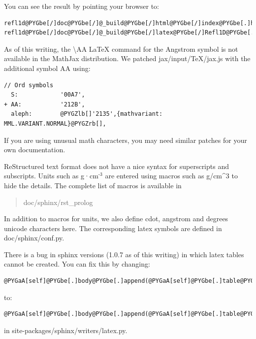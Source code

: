 \documentclass[letterpaper,10pt,english]{sphinxmanual}
\begin{document}
You can see the result by pointing your browser to:

\begin{Verbatim}[commandchars=@\[\]]
refl1d@PYGbe[/]doc@PYGbe[/]@_build@PYGbe[/]html@PYGbe[/]index@PYGbe[.]html
refl1d@PYGbe[/]doc@PYGbe[/]@_build@PYGbe[/]latex@PYGbe[/]Refl1D@PYGbe[.]pdf
\end{Verbatim}

As of this writing, the \textbackslash{}AA LaTeX command for the Angstrom symbol is not
available in the MathJax distribution. We patched jax/input/TeX/jax.js
with the additional symbol AA using:

\begin{Verbatim}[commandchars=@\[\]]
  // Ord symbols
  S:            '00A7',
+ AA:           '212B',
  aleph:        @PYGZlb[]'2135',{mathvariant: MML.VARIANT.NORMAL}@PYGZrb[],
\end{Verbatim}

If you are using unusual math characters, you may need similar patches
for your own documentation.

ReStructured text format does not have a nice syntax for superscripts and
subscripts.  Units such as g·cm$^{\text{-3}}$ are entered using macros such as
\textbar{}g/cm\textasciicircum{}3\textbar{} to hide the details.  The complete list of macros is available in
\begin{quote}

doc/sphinx/rst\_prolog
\end{quote}

In addition to macros for units, we also define cdot, angstrom and degrees
unicode characters here.  The corresponding latex symbols are defined in
doc/sphinx/conf.py.

There is a bug in sphinx versions (1.0.7 as of this writing) in which
latex tables cannot be created.  You can fix this by changing:

\begin{Verbatim}[commandchars=@\[\]]
@PYGaA[self]@PYGbe[.]body@PYGbe[.]append(@PYGaA[self]@PYGbe[.]table@PYGbe[.]colspec)
\end{Verbatim}

to:

\begin{Verbatim}[commandchars=@\[\]]
@PYGaA[self]@PYGbe[.]body@PYGbe[.]append(@PYGaA[self]@PYGbe[.]table@PYGbe[.]colspec@PYGbe[.]lower())
\end{Verbatim}

in site-packages/sphinx/writers/latex.py.
\end{document}
